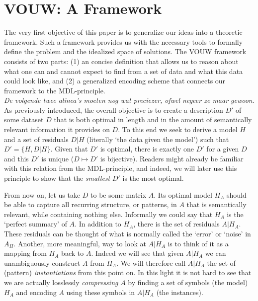 \documentclass{llncs}
\begin{document}
\section{VOUW: A Framework}

The very first objective of this paper is to generalize our ideas into a theoretic framework. Such a framework provides us with the necessary tools to formally define the problem and the idealized space of solutions. The VOUW framework consists of two parts: (1) an concise definition that allows us to reason about what one can and cannot expect to find from a set of data and what this data could look like, and (2) a generalized encoding scheme that connects our framework to the MDL-principle. \\
\textit{De volgende twee alinea's moeten nog wat preciezer, ofwel negeer ze maar gewoon.}
\\

As previously introduced, the overall objective is to create a description $D'$ of some dataset $D$ that is both optimal in length and in the amount of semantically relevant information it provides on $D$. To this end we seek to derive a model $H$ and a set of residuals $D|H$ (literally `the data given the model') such that $D'=\{H,D|H\}$. Given that $D'$ is optimal, there is exactly one $D'$ for a given $D$ and this $D'$ is unique ($D \mapsto D'$ is bijective). Readers might already be familiar with this relation from the MDL-principle, and indeed, we will later use this principle to show that the \emph{smallest} $D'$ is the most optimal.

From now on, let us take $D$ to be some matrix $A$. Its optimal model $H_A$ should be able to capture all recurring structure, or patterns, in $A$ that is semantically relevant, while containing nothing else. Informally we could say that $H_A$ is the `perfect summary' of $A$. In addition to $H_A$, there is the set of residuals $A|H_A$. These residuals can be thought of what is normally called the `error' or `noise' in $A_H$. Another, more meaningful, way to look at $A|H_A$ is to think of it as a mapping from $H_A$ back to $A$. Indeed we will see that given $A|H_A$ we can unambiguously construct $A$ from $H_A$. We will therefore call $A|H_A$ the set of (pattern) \emph{instantiations} from this point on. In this light it is not hard to see that we are actually losslessly \emph{compressing} $A$ by finding a set of symbols (the model) $H_A$ and encoding $A$ using these symbols in $A|H_A$ (the instances).%
\end{document}
